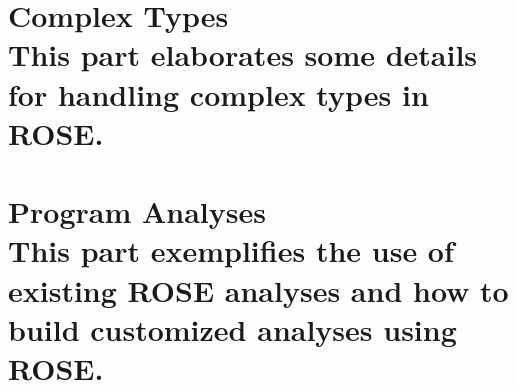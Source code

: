 \documentclass[10pt]{book}
\begin{document}











\part[Complex Types]{ Complex Types \\
\vspace{1.0in}
\normalsize{This part elaborates some details for handling complex types in
ROSE.}
}







\part[Program Analyses]{ Program Analyses \\
\vspace{1.0in}
\normalsize{This part exemplifies the use of existing ROSE analyses and how
to build customized analyses using ROSE.}
}










 
\end{document}

